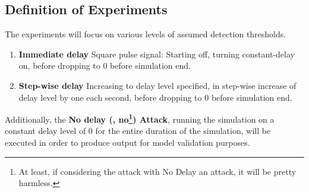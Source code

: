 \subsection{Definition of Experiments} \label{sec:ExpDef}






The experiments will focus on various levels of assumed detection thresholds.


\begin{enumerate}
    \item \textbf{Immediate delay} Square pulse signal: Starting off, turning constant-delay on,  before dropping to 0 before simulation end. 
    \item \textbf{Step-wise delay} Increasing to delay level specified, in step-wise increase of delay level by one each second, before dropping to 0 before simulation end. 
\end{enumerate}

Additionally, the  \textbf{No delay (, no\footnote{At least, if considering the attack with No Delay an attack, it will be pretty harmless. }) Attack}, running the simulation on a constant delay level of $0$ for the entire duration of the simulation, will be executed in order to produce output for model validation purposes. 






